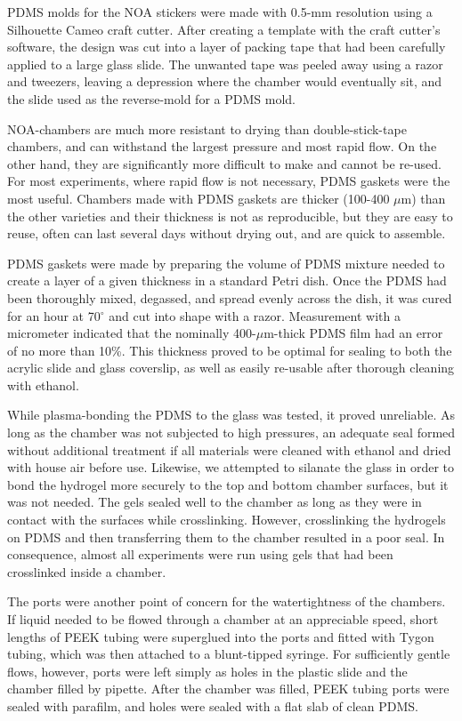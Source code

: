 PDMS molds for the NOA stickers were made with 0.5-mm resolution using a Silhouette Cameo craft cutter.  After creating a template with the craft cutter's software, the design was cut into a layer of packing tape that had been carefully applied to a large glass slide. The unwanted tape was peeled away using a razor and tweezers, leaving a depression where the chamber would eventually sit, and the slide used as the reverse-mold for a PDMS mold.

NOA-chambers are much more resistant to drying than double-stick-tape chambers, and can withstand the largest pressure and most rapid flow.  On the other hand, they are significantly more difficult to make and cannot be re-used.  For most experiments, where rapid flow is not necessary, PDMS gaskets were the most useful.  Chambers made with PDMS gaskets are thicker (100-400 $\mu$m) than the other varieties and their thickness is not as reproducible, but they are easy to reuse, often can last several days without drying out, and are quick to assemble.  

PDMS gaskets were made by preparing the volume of PDMS mixture needed to create a layer of a given thickness in a standard Petri dish.  Once the PDMS had been thoroughly mixed, degassed, and spread evenly across the dish, it was cured for an hour at 70$^\circ$ and cut into shape with a razor.  Measurement with a micrometer indicated that the nominally 400-$\mu$m-thick PDMS film had an error of no more than 10\%.  This thickness proved to be optimal for sealing to both the acrylic slide and glass coverslip, as well as easily re-usable after thorough cleaning with ethanol.

While plasma-bonding the PDMS to the glass was tested, it proved unreliable.  As long as the chamber was not subjected to high pressures, an adequate seal formed without additional treatment if all materials were cleaned with ethanol and dried with house air before use. Likewise, we attempted to silanate the glass in order to bond the hydrogel more securely to the top and bottom chamber surfaces, but it was not needed.  The gels sealed well to the chamber as long as they were in contact with the surfaces while crosslinking.  However, crosslinking the hydrogels on PDMS and then transferring them to the chamber resulted in a poor seal.  In consequence, almost all experiments were run using gels that had been crosslinked inside a chamber.

The ports were another point of concern for the watertightness of the chambers.  If liquid needed to be flowed through a chamber at an appreciable speed, short lengths of PEEK tubing were superglued into the ports and fitted with Tygon tubing, which was then attached to a blunt-tipped syringe.  For sufficiently gentle flows, however, ports were left simply as holes in the plastic slide and the chamber filled by pipette.  After the chamber was filled, PEEK tubing ports were sealed with parafilm, and holes were sealed with a flat slab of clean PDMS.

